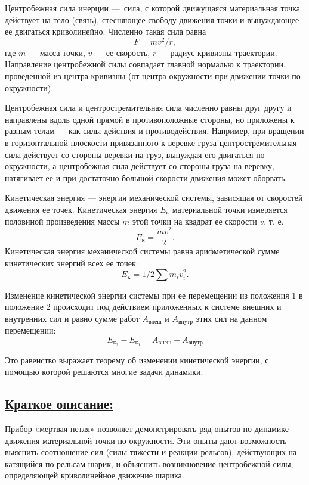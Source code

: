 \documentclass[14pt,a4paper,oneside]{extarticle}	%
\begin{document}
Центробежная сила инерции — сила, с которой движущаяся материальная точка действует на тело (связь),
стесняющее свободу движения точки и вынуждающее ее двигаться криволинейно. 
Численно такая сила равна $$F = mv^2/r,$$ 
где $ m $ — масса точки, $ v $ — ее скорость, $ r $ — радиус кривизны траектории.
Направление центробежной силы совпадает главной нормалью к траектории, проведенной из центра кривизны 
(от центра окружности при движении точки по окружности).

Центробежная сила и центростремительная сила численно равны друг другу и направлены вдоль одной прямой в 
противоположные стороны, но приложены к разным телам — как силы действия и противодействия. 
Например, при вращении в горизонтальной плоскости привязанного к веревке груза 
центростремительная сила действует со стороны веревки на груз, вынуждая его двигаться 
по окружности, а центробежная сила действует со стороны груза на веревку, натягивает ее и при 
достаточно большой скорости движения может оборвать.

Кинетическая энергия — энергия механической системы, зависящая от скоростей движения ее точек.
Кинетическая энергия $ E_{\text{к}} $ материальной точки измеряется половиной произведения массы $ m $ этой точки на квадрат ее скорости $ v $, т. е. $$ E_{\text{к}}  = \frac{mv^2}{2}. $$ 
Кинетическая энергия механической системы равна арифметической сумме кинетических энергий всех ее точек: 
$$ E_{\text{к}}  = 1/2 \sum  m_i v_i^2.$$ 

Изменение кинетической энергии системы при ее перемещении из положения 1 в положение 2 
происходит под действием приложенных к системе внешних и внутренних сил и равно сумме работ $ A_{\text{внеш}}$ и $ A_{\text{внутр}}$ этих сил на данном перемещении:
$$
E_{\text{к}_{2}} - E_{\text{к}_{1}} = A_{\text{внеш}} + A_{\text{внутр}}
$$
 
Это равенство выражает теорему об изменении кинетической энергии, с помощью которой решаются многие задачи динамики.

\newpage
\subsection*{\underline{Краткое описание:}}

Прибор «мертвая петля» позволяет демонстрировать ряд опытов по динамике движения материальной точки по окружности.
Эти опыты дают возможность выяснить соотношение сил (силы тяжести и реакции рельсов), действующих на катящийся по рельсам шарик, и объяснить возникновение центробежной силы, определяющей криволинейное движение шарика.
\end{document}
